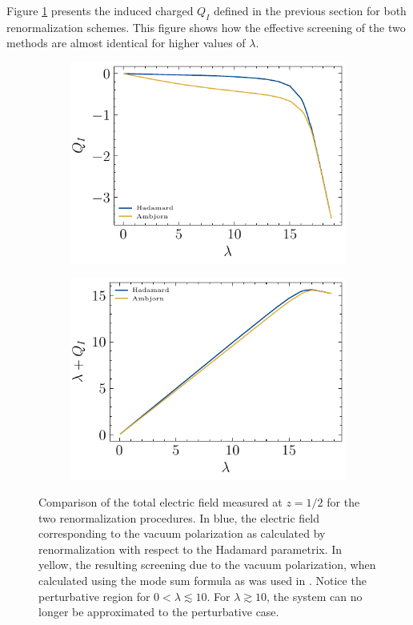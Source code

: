 Figure \ref{fig:different-lambda-rho} presents the induced charged $Q_I$ defined in the previous section for both renormalization schemes. This figure shows how the effective screening of the two methods are almost identical for higher values of $\lambda$.
\begin{figure}
\begin{subfigure}{0.5\textwidth}
    \centering
    \includegraphics[width=\linewidth]{figures/dirichlet/inducedChargeComparison.pdf}
\begin{subfigure}{0.5\textwidth}
\end{subfigure}
    \centering
    \includegraphics[width=\linewidth]{figures/dirichlet/electricFieldInducedComparison.pdf}
\end{subfigure}
\caption{Comparison of the total electric field measured at $z=1/2$ for the two renormalization procedures. In blue, the electric field corresponding to the vacuum polarization as calculated by renormalization with respect to the Hadamard parametrix. In yellow, the resulting screening due to the vacuum polarization, when calculated using the mode sum formula as was used in \cite{Ambj1983}. Notice the perturbative region for $0 <\lambda \lesssim10$. For $\lambda \gtrsim 10$, the system can no longer be approximated to the perturbative case. } 
    \label{fig:different-lambda-rho}
\end{figure}

